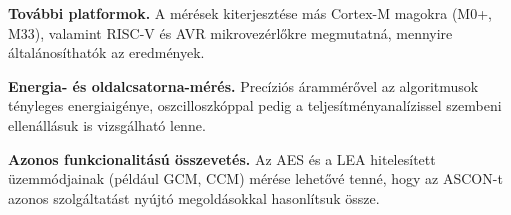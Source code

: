 \documentclass[a4paper,12pt]{report}
\theoremstyle{definition}
\theoremstyle{remark}
\begin{document}
\textbf{További platformok.} A mérések kiterjesztése más Cortex-M magokra (M0+, M33), valamint RISC-V és AVR mikrovezérlőkre megmutatná, mennyire általánosíthatók az eredmények.

\textbf{Energia- és oldalcsatorna-mérés.} Precíziós árammérővel az algoritmusok tényleges energiaigénye, oszcilloszkóppal pedig a teljesítményanalízissel szembeni ellenállásuk is vizsgálható lenne.

\textbf{Azonos funkcionalitású összevetés.} Az AES és a LEA hitelesített üzemmódjainak (például GCM, CCM) mérése lehetővé tenné, hogy az ASCON-t azonos szolgáltatást nyújtó megoldásokkal hasonlítsuk össze.

\begingroup
\footnotesize   %
\singlespacing
\end{document}
